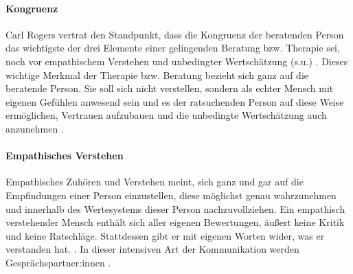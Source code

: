 \documentclass[
  twoside,
  parskip=half-,
  paper=176mm:246mm,
  BCOR=14mm,
  DIV=14,
]{scrreprt}
\begin{document}
\paragraph{Kongruenz} Carl Rogers vertrat den Standpunkt, dass die Kongruenz der beratenden Person das wichtigste der drei Elemente einer gelingenden Beratung bzw. Therapie sei, noch vor empathischem Verstehen und unbedingter Wertschätzung (s.u.) \autocite[vgl.][162]{rogers1977}.
 Dieses wichtige Merkmal der Therapie bzw. Beratung bezieht sich ganz auf die beratende Person. Sie soll sich nicht verstellen, sondern als echter Mensch mit eigenen Gefühlen anwesend sein und es der ratsuchenden Person auf diese Weise ermöglichen, Vertrauen aufzubauen und die unbedingte Wertschätzung auch anzunehmen \autocite[vgl.][151]{rogers1977}.

\paragraph{Empathisches Verstehen} Empathisches Zuhören und Verstehen meint, sich ganz und gar auf die Empfindungen einer Person einzustellen, diese möglichst genau wahrzunehmen und innerhalb des Wertesystems dieser Person nachzuvollziehen. Ein empathisch verstehender Mensch enthält sich aller eigenen Bewertungen, äußert keine Kritik und keine Ratschläge. Stattdessen gibt er mit eigenen Worten wider, was er verstanden hat. . In dieser intensiven Art der Kommunikation werden Gesprächspartner:innen .
\end{document}
